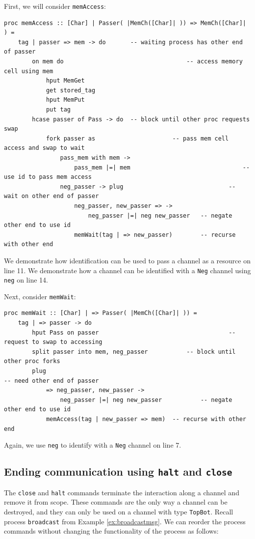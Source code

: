 \documentclass[acmsmall]{acmart}
\begin{document}
First, we will consider \lstinline$memAccess$:
\begin{lstlisting}
proc memAccess :: [Char] | Passer( |MemCh([Char]| )) => MemCh([Char]| ) =
	tag | passer => mem -> do		-- waiting process has other end of passer
		on mem do									-- access memory cell using mem
			hput MemGet
			get stored_tag
			hput MemPut
			put tag
		hcase passer of Pass -> do	-- block until other proc requests swap
			fork passer as						-- pass mem cell access and swap to wait
				pass_mem with mem -> 
					pass_mem |=| mem								-- use id to pass mem access
				neg_passer -> plug								-- wait on other end of passer
					neg_passer, new_passer => ->		
						neg_passer |=| neg new_passer	-- negate other end to use id
					memWait(tag | => new_passer)		-- recurse with other end
\end{lstlisting}
We demonstrate how identification can be used to pass a channel as a resource on line 11.
We demonstrate how a channel can be identified with a \lstinline$Neg$ channel using \lstinline$neg$ on line 14.

Next, consider \lstinline$memWait$:
\begin{lstlisting}
proc memWait :: [Char] | => Passer( |MemCh([Char]| )) =
	tag | => passer -> do
		hput Pass on passer										-- request to swap to accessing
		split passer into mem, neg_passer			-- block until other proc forks
		plug																	-- need other end of passer
			=> neg_passer, new_passer -> 
				neg_passer |=| neg new_passer			-- negate other end to use id
			memAccess(tag | new_passer => mem)	-- recurse with other end
\end{lstlisting}
Again, we use  \lstinline$neg$ to identify with a \lstinline$Neg$ channel on line 7.


\subsection{Ending communication using \lstinline$halt$ and \lstinline$close$}
\label{sec:close}

The \lstinline$close$ and \lstinline$halt$ commands terminate the interaction along a channel and remove it from scope. 
These commands are the only way a channel can be destroyed, and they can only be used on a channel with type \lstinline$TopBot$.
Recall process \lstinline$broadcast$ from Example \ref{ex:broadcastmsg}.
We can reorder the process commands without changing the functionality of the process as follows:
\end{document}
